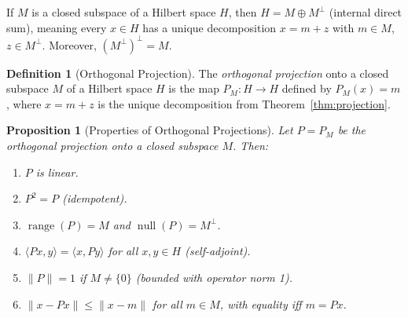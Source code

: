 \documentclass[11pt,a4paper]{article}
\theoremstyle{definition}
\newtheorem{definition}{Definition}[section]
\theoremstyle{plain}
\newtheorem{proposition}[theorem]{Proposition}
\theoremstyle{remark}
\DeclareMathOperator{\range}{range}
\DeclareMathOperator{\nullspace}{null}
\begin{document}
\begin{keyresult}
If $M$ is a closed subspace of a Hilbert space $H$, then
$H = M \oplus M^\perp$ (internal direct sum), meaning every $x \in H$ has
a unique decomposition $x = m + z$ with $m \in M$, $z \in M^\perp$.
Moreover, $(M^\perp)^\perp = M$.
\end{keyresult}

\begin{definition}[Orthogonal Projection]\label{def:projection-operator}
The \emph{orthogonal projection} onto a closed subspace $M$ of a Hilbert
space $H$ is the map $P_M \colon H \to H$ defined by $P_M(x) = m$, where
$x = m + z$ is the unique decomposition from Theorem~\ref{thm:projection}.
\end{definition}

\begin{proposition}[Properties of Orthogonal Projections]\label{prop:projection-props}
Let $P = P_M$ be the orthogonal projection onto a closed subspace $M$. Then:
\begin{enumerate}[label=(\roman*)]
    \item $P$ is linear.
    \item $P^2 = P$ (idempotent).
    \item $\range(P) = M$ and $\nullspace(P) = M^\perp$.
    \item $\langle Px, y \rangle = \langle x, Py \rangle$ for all $x, y \in H$
          (self-adjoint).
    \item $\|P\| = 1$ if $M \neq \{0\}$ (bounded with operator norm 1).
    \item $\|x - Px\| \leq \|x - m\|$ for all $m \in M$, with equality iff
          $m = Px$.
\end{enumerate}
\end{proposition}
\end{document}
